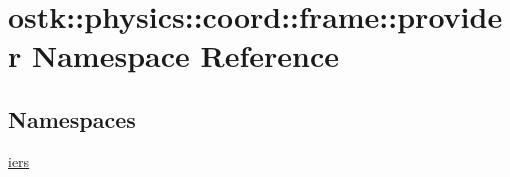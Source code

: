 \hypertarget{namespaceostk_1_1physics_1_1coord_1_1frame_1_1provider}{}\section{ostk\+:\+:physics\+:\+:coord\+:\+:frame\+:\+:provider Namespace Reference}
\label{namespaceostk_1_1physics_1_1coord_1_1frame_1_1provider}
\subsection*{Namespaces}
\begin{DoxyCompactItemize}
\item 
 \hyperlink{namespaceostk_1_1physics_1_1coord_1_1frame_1_1provider_1_1iers}{iers}
\end{DoxyCompactItemize}
